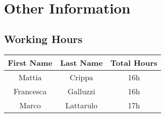 \chapter{Other Information} \label{chap6}

\section{Working Hours}

\begin{table}[htbp]
\begin{center}
\begin{tabular}[t]{ccc}

\hline
\textbf{First Name} & \textbf{Last Name} & \textbf{Total Hours} \\
\hline
Mattia & Crippa &  16h\\
\hline
Francesca & Galluzzi &  16h\\
\hline
Marco & Lattarulo & 17h\\
\hline

\end{tabular}
\end{center}
\end{table}
